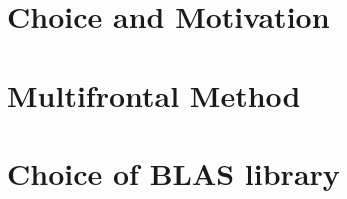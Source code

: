 




















\section{Choice and Motivation}
\label{subseq:choice and motivation}



\section{Multifrontal Method}
\label{subseq:multifrontal method}

\section{Choice of BLAS library}
\label{subseq:blas-comparison}




